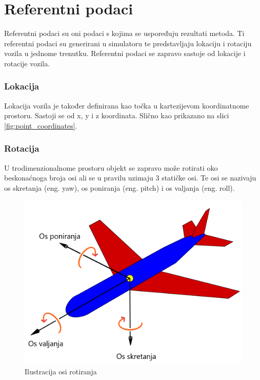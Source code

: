 \section{Referentni podaci}

Referentni podaci su oni podaci s kojima se uspoređuju rezultati metoda. Ti referentni podaci su generirani u simulatoru te predstavljaju lokaciju i rotaciju vozila u jednome trenutku. Referentni podaci se zapravo sastoje od lokacije i rotacije vozila.

\subsubsection{Lokacija}
Lokacija vozila je također definirana kao točka u kartezijevom koordinatnome prostoru. Sastoji se od x, y i z koordinata. Slično kao prikazano na slici \ref{fig:point_coordinates}.


\subsubsection{Rotacija}
 U trodimenzionalnome prostoru objekt se zapravo može rotirati oko beskonaćnoga broja osi ali se u pravilu uzimaju 3 statičke osi. Te osi se nazivaju os skretanja (eng. yaw), os poniranja (eng. pitch) i os valjanja (eng. roll). 

\begin{figure}[!ht]
  \centering
  \includegraphics[scale=0.3]{images/yaw_roll_pitch_example.png}
  \caption{Ilustracija osi rotiranja}
  \label{fig:yaw_roll_pitch_example}
\end{figure}


